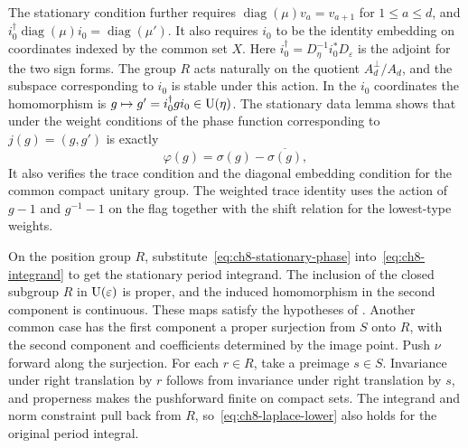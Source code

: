 The stationary condition further requires $\operatorname{diag}(\mu)v_a=v_{a+1}$ for $1\le a\le d$, and $i_0^\dagger\operatorname{diag}(\mu)i_0=\operatorname{diag}(\mu')$. It also requires $i_0$ to be the identity embedding on coordinates indexed by the common set $X$. Here $i_0^\dagger=D_\eta^{-1}i_0^*D_\varepsilon$ is the adjoint for the two sign forms. The group $R$ acts naturally on the quotient $A_d^\perp/A_d$, and the subspace corresponding to $i_0$ is stable under this action. In the $i_0$ coordinates the homomorphism is $g\mapsto g'=i_0^\dagger g i_0\in \operatorname{U}(\eta)$. The stationary data lemma shows that under the weight conditions of  the phase function corresponding to $j(g)=(g,g')$ is exactly
\begin{equation}
\label{eq:ch8-stationary-phase}
 \varphi(g)=\sigma(g)-\overline{\sigma(g)},
\end{equation}
It also verifies the trace condition and the diagonal embedding condition for the common compact unitary group. The weighted trace identity uses the action of $g-1$ and $g^{-1}-1$ on the flag together with the shift relation for the lowest-type weights.

\label{use:ch8-stationary-period}On the position group $R$, substitute~\eqref{eq:ch8-stationary-phase} into~\eqref{eq:ch8-integrand} to get the stationary period integrand. The inclusion of the closed subgroup $R$ in $\operatorname{U}(\varepsilon)$ is proper, and the induced homomorphism in the second component is continuous. These maps satisfy the hypotheses of . Another common case has the first component a proper surjection from $S$ onto $R$, with the second component and coefficients determined by the image point. Push $\nu$ forward along the surjection. For each $r\in R$, take a preimage $s\in S$. Invariance under right translation by $r$ follows from invariance under right translation by $s$, and properness makes the pushforward finite on compact sets. The integrand and norm constraint pull back from $R$, so~\eqref{eq:ch8-laplace-lower} also holds for the original period integral.

